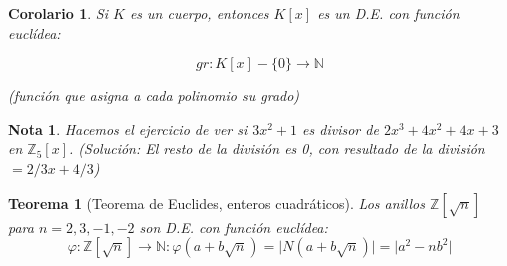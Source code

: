 \documentclass[11pt, a4paper, titlepage]{article}
\newif\IfInSansMode
\providecommand{\ent}{\mathbb{Z}}
\providecommand{\nat}{\mathbb{N}}
\providecommand{\abs}[1]{\lvert#1\rvert}
\theoremstyle{theorem-style}
\newtheorem{nth}{Teorema}[section]
\newtheorem{ncor}{Corolario}[section]
\theoremstyle{definition-style}
\theoremstyle{remark-style}
\newtheorem*{nota}{Nota}
\theoremstyle{example-style}
\begin{document}
\begin{ncor}
	Si $K$ es un cuerpo, entonces $K[x]$ es un D.E. con función euclídea:

	\[
	gr: K[x]-\{0\} \to \nat
	\]

(función que asigna a cada polinomio su grado)
\end{ncor}

\begin{nota}
	Hacemos el ejercicio de ver si $3x^2 +1$ es divisor de $2x^3 + 4x^2 +4x +3$ en $\ent _5[x]$. (Solución: El resto de la división es 0, con resultado de la división $= 2/3 x + 4/3$)
\end{nota}


\begin{nth}[Teorema de Euclides, enteros cuadráticos]
	Los anillos $\ent[\sqrt{n}]$ para $n=2,3,-1,-2$ son D.E. con función euclídea:
	\[
	\varphi: \ent[\sqrt{n}] \to \nat : \varphi(a+b\sqrt{n}) = \abs{N(a+b\sqrt{n})} = \abs{a^2 - nb^2}
	\]


\end{nth}
\end{document}
